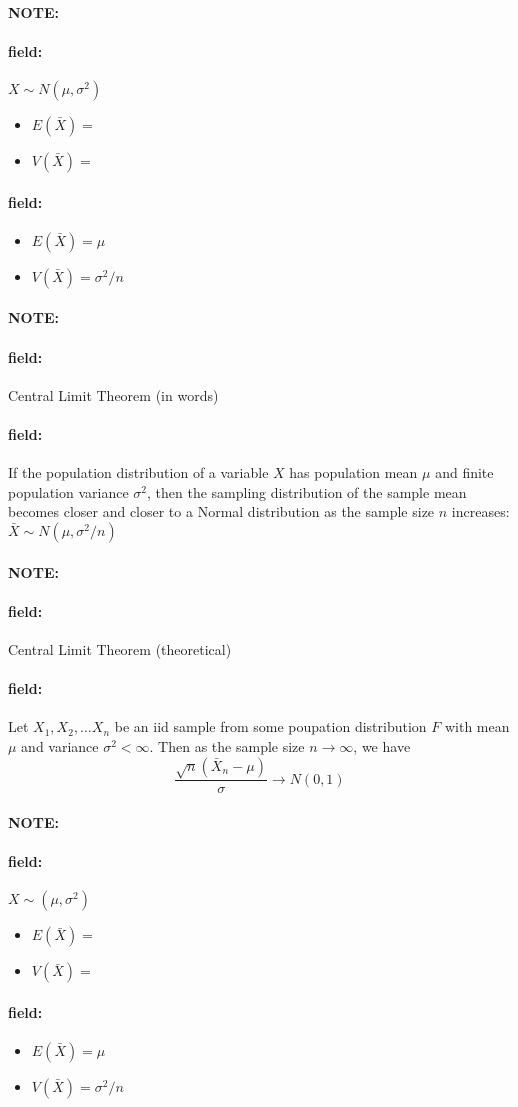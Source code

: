 \documentclass[12pt]{article}
\newenvironment{note}{\paragraph{NOTE:}}{}
\newenvironment{field}{\paragraph{field:}}{}
\begin{document}
\begin{note}
	\begin{field}
		$X \sim N(\mu,\sigma^2)$
		\begin{itemize}
			\item $E(\bar{X}) = $
			\item $V(\bar{X}) = $
		\end{itemize}
	\end{field}
	\begin{field}
		\begin{itemize}
			\item $E(\bar{X}) = \mu$
			\item $V(\bar{X}) = \sigma^2/n$
		\end{itemize}
	\end{field}
\end{note}

\begin{note}
	\begin{field}
		Central Limit Theorem (in words)
	\end{field}
	\begin{field}
		If the population distribution of a variable $X$ has population mean $\mu$ and finite population variance $\sigma^2$, then the sampling distribution of the sample mean becomes closer and closer to a Normal distribution as the sample size $n$ increases: $\bar{X} \sim N(\mu,\sigma^2/n)$
	\end{field}
\end{note}

\begin{note}
	\begin{field}
		Central Limit Theorem (theoretical)
	\end{field}
	\begin{field}
		Let $X_1, X_2, \ldots X_n$ be an iid sample from some poupation distribution $F$ with mean $\mu$ and variance $\sigma^2 < \infty$. Then as the sample size $n \to \infty$, we have $$\frac{\sqrt{n}(\bar{X}_n - \mu)}{\sigma} \to N(0,1)$$
	\end{field}
\end{note}

\begin{note}
	\begin{field}
		$X \sim (\mu,\sigma^2)$
		\begin{itemize}
			\item $E(\bar{X}) = $
			\item $V(\bar{X}) = $
		\end{itemize}
	\end{field}
	\begin{field}
		\begin{itemize}
			\item $E(\bar{X}) = \mu$
			\item $V(\bar{X}) = \sigma^2/n$
		\end{itemize}
	\end{field}
\end{note}
\end{document}
